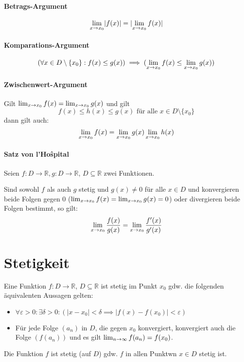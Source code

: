 		\paragraph{Betrags-Argument}
			\[ \lim_{x \to x_0 } \lvert f(x) \rvert = \lvert \lim_{x \to x_0 } f(x) \rvert \]

		\paragraph{Komparations-Argument}
			\[ (\forall x \in D \setminus \{ x _ 0 \} : f(x) \leq g(x)) \implies (\lim_{x \to x_0 } f(x) \leq \lim_{x \to x_0 } g(x)) \]

		\paragraph{Zwischenwert-Argument}
			Gilt $ \lim_{x \to x_0 } f(x) = \lim_{x \to x_0 } g(x) $ und gilt
			\begin{equation*}
				f(x) \leq h(x) \leq g(x) \text{ für alle } x \in D \setminus \{ x _ 0 \}
			\end{equation*}
			\indent dann gilt auch:
			\begin{equation*}
				\lim_{x \to x_0 } f(x) = \lim_{x \to x_0 } g(x) \lim_{x \to x_0 } h(x)
			\end{equation*}

		\paragraph{Satz von l'Ho{\^s}pital}
			Seien $ f : D \rightarrow \mathbb{R}, g : D \rightarrow \mathbb{R} $, $ D \subseteq \mathbb{R} $ zwei Funktionen.

			Sind sowohl $ f $ als auch $ g $ stetig und $ g(x) \neq 0 $ für alle $ x \in D $ und konvergieren beide Folgen gegen $ 0 $ ($ \lim_{x \to x_0 } f(x) = \lim_{x \to x_0 } g(x) = 0 $) oder divergieren beide Folgen bestimmt, so gilt:
			\begin{equation*}
				\lim_{x \to x_0 } \frac{f(x)}{g(x)} = \lim_{x \to x_0 } \frac{f'(x)}{g'(x)}
			\end{equation*}

	\section{Stetigkeit}
		Eine Funktion $ f : D \rightarrow \mathbb{R} $, $ D \subseteq \mathbb{R} $ ist stetig im Punkt $ x _ 0 $ gdw. die folgenden äquivalenten Aussagen gelten:
		\begin{itemize}
			\item $ \forall \varepsilon > 0 : \exists \delta > 0 : (\lvert x - x _ 0 \rvert < \delta \implies \lvert f(x) - f(x _ 0) \rvert < \varepsilon) $
			\item Für jede Folge $ (a _ n) $ in $ D $, die gegen $ x _ 0 $ konvergiert, konvergiert auch die Folge $ (f(a _ n)) $ und es gilt $ \lim_{n \to \infty} f(a _ n) = f(x _ 0) $.
		\end{itemize}
		Die Funktion $ f $ ist stetig (auf $ D $) gdw. $ f $ in allen Punktwn $ x \in D $ stetig ist.

